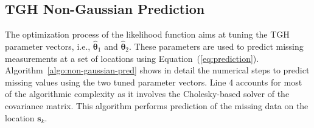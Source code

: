 \documentclass[conference]{IEEEtran}
\begin{document}
%


\subsection{TGH Non-Gaussian Prediction}
The optimization process of the likelihood function aims
at tuning the TGH parameter vectors, i.e., $\widehat{\bm{\theta}}_1$
 and $\widehat{\bm{\theta}}_2$. These parameters are used to
 predict missing measurements at a set of locations using 
 Equation~(\ref{eq:prediction}). Algorithm~\ref{algo:non-gaussian-pred} 
shows in detail the numerical steps to predict missing
 values using the two tuned parameter vectors. 
Line 4 accounts for most of the algorithmic complexity as it involves the Cholesky-based
solver of the covariance matrix. This algorithm performs prediction of the missing data
on the location $\bm{s}_k$.
\end{document}
